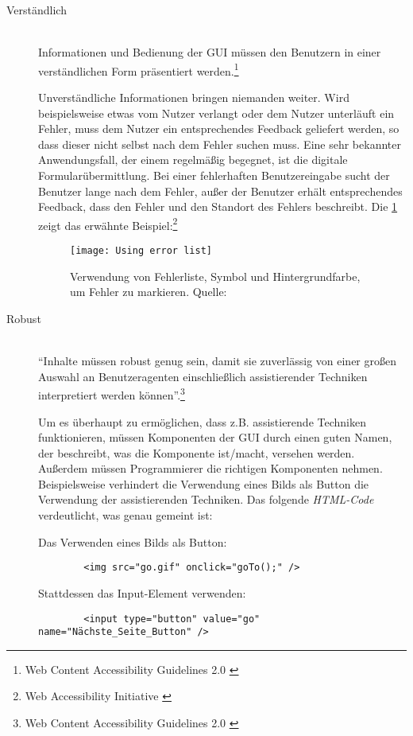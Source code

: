 \begin{description}
	
	\item [Verständlich]\hfill \\
	Informationen und Bedienung der \ac{GUI} müssen den Benutzern in einer verständlichen Form präsentiert 
	werden.\footnote{Web Content Accessibility Guidelines 2.0 \cite{WCAG2.0}}
	
	Unverständliche Informationen bringen niemanden weiter. Wird beispielsweise etwas vom Nutzer verlangt oder dem Nutzer unterläuft ein Fehler, muss dem Nutzer ein entsprechendes 
	Feedback geliefert werden, so dass dieser nicht selbst nach dem Fehler suchen muss. Eine sehr bekannter Anwendungsfall, der einem regelmäßig begegnet, 
	ist die digitale Formularübermittlung. Bei einer fehlerhaften Benutzereingabe sucht der Benutzer lange nach dem Fehler, außer der Benutzer erhält entsprechendes 
	Feedback, dass den Fehler und den Standort des Fehlers beschreibt. Die \cref{fig:Using error list} zeigt das erwähnte Beispiel:\footnote{Web Accessibility Initiative \cite{WAI}}
	
	\begin{figure}[H]
		\centering
		\texttt{[image: Using error list]}
		\caption[Verwendung von Fehlerliste, Symbol und Hintergrundfarbe, um Fehler zu markieren]{Verwendung von Fehlerliste, Symbol
		 und Hintergrundfarbe, um Fehler zu markieren. Quelle: \cite{WAI}}
		\label{fig:Using error list}
	\end{figure}
	
	\item [Robust]\hfill \\
	"`Inhalte müssen robust genug sein, damit sie zuverlässig von einer großen Auswahl an Benutzeragenten einschließlich assistierender Techniken 
	interpretiert werden können"'.\footnote{Web Content Accessibility Guidelines 2.0 \cite{WCAG2.0}}
	
	Um es überhaupt zu ermöglichen, dass z.B. assistierende Techniken funktionieren, müssen Komponenten der \ac{GUI} durch einen guten Namen, der beschreibt, was die Komponente
	ist/macht, versehen werden. Außerdem müssen Programmierer die richtigen Komponenten nehmen. Beispielsweise verhindert die Verwendung eines Bilds als Button die Verwendung 
	der assistierenden Techniken. Das folgende \textit{HTML-Code} verdeutlicht, was genau gemeint ist:
	
	Das Verwenden eines Bilds als Button:
	
	{\color{blue}
	\begin{verbatim}
		<img src="go.gif" onclick="goTo();" />
	\end{verbatim}}
	
	Stattdessen das Input-Element verwenden:
	
	{\color{blue}
	\begin{verbatim}
		<input type="button" value="go" name="Nächste_Seite_Button" />
	\end{verbatim}}
	
\end{description}

